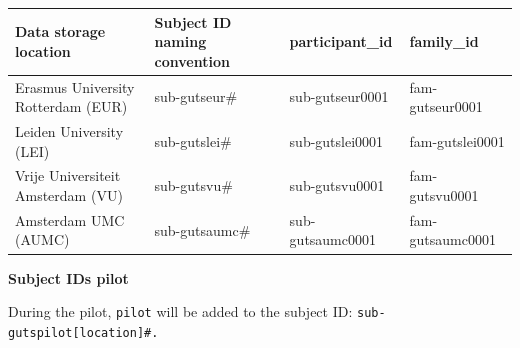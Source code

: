 \documentclass[
  letterpaper,
  DIV=11,
  numbers=noendperiod]{scrreprt}
\begin{document}
\begin{tcolorbox}
\label{naming-convention-table-1}
\begin{longtable}[]{@{}
  >{\raggedright\arraybackslash}p{}
  >{\raggedright\arraybackslash}p{}
  >{\raggedright\arraybackslash}p{}
  >{\raggedright\arraybackslash}p{}@{}}
\toprule\noalign{}
\begin{minipage}[b]{\linewidth}\raggedright
Data storage location
\end{minipage} & \begin{minipage}[b]{\linewidth}\raggedright
Subject ID naming convention
\end{minipage} & \begin{minipage}[b]{\linewidth}\raggedright
participant\_id
\end{minipage} & \begin{minipage}[b]{\linewidth}\raggedright
family\_id
\end{minipage} \\
\midrule\noalign{}
\endhead
\bottomrule\noalign{}
\endlastfoot
Erasmus University Rotterdam (EUR) & sub-gutseur\# & sub-gutseur0001 &
fam-gutseur0001 \\
Leiden University (LEI) & sub-gutslei\# & sub-gutslei0001 &
fam-gutslei0001 \\
Vrije Universiteit Amsterdam (VU) & sub-gutsvu\# & sub-gutsvu0001 &
fam-gutsvu0001 \\
Amsterdam UMC (AUMC) & sub-gutsaumc\# & sub-gutsaumc0001 &
fam-gutsaumc0001 \\
\end{longtable}

\textbf{Subject IDs pilot}

During the pilot, \texttt{\textquotesingle{}pilot\textquotesingle{}}
will be added to the subject ID:
\texttt{\textquotesingle{}sub-gutspilot{[}location{]}\#\textquotesingle{}.}

\end{tcolorbox}
\end{document}
